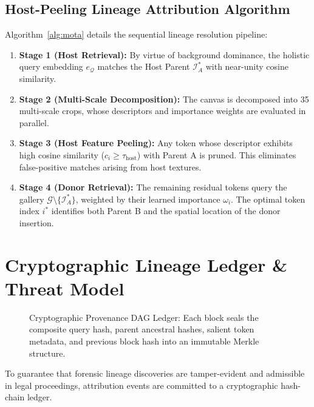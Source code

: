 \documentclass[journal]{IEEEtran}
\begin{document}
\subsection{Host-Peeling Lineage Attribution Algorithm}
Algorithm~\ref{alg:mota} details the sequential lineage resolution pipeline:
\begin{enumerate}
    \item \textbf{Stage 1 (Host Retrieval):} By virtue of background dominance, the holistic query embedding $e_\mathcal{Q}$ matches the Host Parent $\mathcal{I}_A^*$ with near-unity cosine similarity.
    \item \textbf{Stage 2 (Multi-Scale Decomposition):} The canvas is decomposed into 35 multi-scale crops, whose descriptors and importance weights are evaluated in parallel.
    \item \textbf{Stage 3 (Host Feature Peeling):} Any token whose descriptor exhibits high cosine similarity ($c_i \ge \tau_{\text{host}}$) with Parent A is pruned. This eliminates false-positive matches arising from host textures.
    \item \textbf{Stage 4 (Donor Retrieval):} The remaining residual tokens query the gallery $\mathcal{G} \setminus \{\mathcal{I}_A^*\}$, weighted by their learned importance $\omega_i$. The optimal token index $i^*$ identifies both Parent B and the spatial location of the donor insertion.
\end{enumerate}

\section{Cryptographic Lineage Ledger \& Threat Model}

\begin{figure}[t]
\centering
\fbox{\rule{0pt}{1.8in} \rule{0.95\linewidth}{0pt}}
\caption{Cryptographic Provenance DAG Ledger: Each block seals the composite query hash, parent ancestral hashes, salient token metadata, and previous block hash into an immutable Merkle structure.}
\label{fig:ledger}
\end{figure}

To guarantee that forensic lineage discoveries are tamper-evident and admissible in legal proceedings, attribution events are committed to a cryptographic hash-chain ledger.
\end{document}
